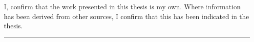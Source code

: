I, \theauthor confirm that the work presented in this thesis is my own.
Where information has been derived from other sources, I confirm that
this has been indicated in the thesis.
\vspace*{3cm}
\begin{flushright}
\shortAuthor\hspace*{0.1\textwidth}\rule{0.5\textwidth}{0.25pt}
\end{flushright}
